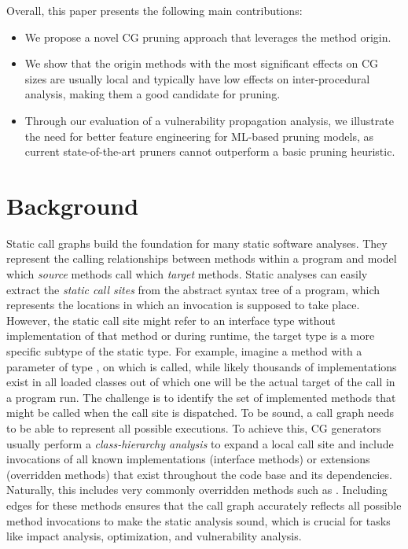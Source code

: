 \smallskip
\noindent
Overall, this paper presents the following main contributions:

\begin{itemize}
%
\item We propose a novel CG pruning approach that leverages the method origin.
%
\item We show that the origin methods with the most significant effects on CG sizes are usually local and typically have low effects on inter-procedural analysis, making them a good candidate for pruning.
%
\item Through our evaluation of a vulnerability propagation analysis, we illustrate the need for better feature engineering for ML-based pruning models, as current state-of-the-art pruners cannot outperform a basic pruning heuristic.
%
\end{itemize}

\section{Background}\label{ch2:sec:motive}
Static call graphs build the foundation for many static software analyses.
They represent the calling relationships between methods within a program and model which \emph{source} methods call which \emph{target} methods.
Static analyses can easily extract the \emph{static call sites} from the abstract syntax tree of a program, which represents the locations in which an invocation is supposed to take place.
However, the static call site might refer to an interface type without implementation of that method or during runtime, the target type is a more specific subtype of the static type.
For example, imagine a method with a parameter of type , on which  is called, while likely thousands of  implementations exist in all loaded classes out of which one will be the actual target of the call in a program run.
The challenge is to identify the set of implemented methods that might be called when the call site is dispatched.
To be sound, a call graph needs to be able to represent all possible executions.
To achieve this, CG generators usually perform a \emph{class-hierarchy analysis} to expand a local call site and include invocations of all known implementations (interface methods) or extensions (overridden methods) that exist throughout the code base and its dependencies.
Naturally, this includes very commonly overridden methods such as .
Including edges for these methods ensures that the call graph accurately reflects all possible method invocations to make the static analysis sound, which is crucial for tasks like impact analysis, optimization, and vulnerability analysis.

